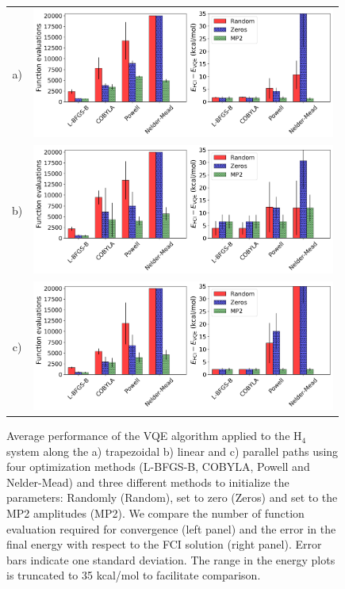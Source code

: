 \documentclass[superscriptaddress,aps,pra,twocolumn,nofootinbib,babel]{revtex4-1}
\begin{document}
\begin{figure}
\centering
\begin{tabular}{cc} 
a) & \includegraphics[width=10cm]{figures/Tsumme.png} \\
b) & \includegraphics[width=10cm]{figures/Lsumme.png} \\
c) & \includegraphics[width=10cm]{figures/Psumme.png} \\
\end{tabular}
\caption{Average performance of the VQE algorithm applied to the H$_4$ system along the a) trapezoidal b) linear and c) parallel paths using four optimization methods (L-BFGS-B, COBYLA, Powell and Nelder-Mead) and three different methods to initialize the parameters: Randomly (Random), set to zero (Zeros) and set to the MP2 amplitudes (MP2). We compare the number of function evaluation required for convergence (left panel) and the error in the final energy with respect to the FCI solution (right panel). Error bars indicate one standard deviation. The range in the energy plots is truncated to 35 kcal/mol to facilitate comparison.}\label{fig:optimizationT}
\end{figure}
\end{document}
